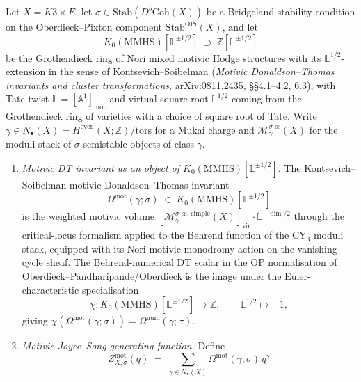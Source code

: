 \begin{conjecture}
\label{prop:k3e-cy3-motivic-dt-js-integrality-wc}
\ClaimStatusConjectured
Let $X = K3 \times E$, let $\sigma \in \mathrm{Stab}(D^b\mathrm{Coh}(X))$ be a Bridgeland stability condition on the Oberdieck--Pixton component $\mathrm{Stab}^{\mathrm{OPi}}(X)$, and let
\[
 K_0(\mathrm{MMHS})[\mathbb L^{\pm 1/2}] \;\supset\; \mathbb Z[\mathbb L^{\pm 1/2}]
\]
be the Grothendieck ring of Nori mixed motivic Hodge structures with its $\mathbb L^{1/2}$-extension in the sense of Kontsevich--Soibelman (\emph{Motivic Donaldson--Thomas invariants and cluster transformations}, arXiv:0811.2435, \S\S4.1--4.2, 6.3), with Tate twist $\mathbb L = [\mathbb A^1]_{\mathrm{mot}}$ and virtual square root $\mathbb L^{1/2}$ coming from the Grothendieck ring of varieties with a choice of square root of Tate. Write $\gamma \in N_\bullet(X) = H^{\mathrm{even}}(X; \mathbb Z)/\mathrm{tors}$ for a Mukai charge and $\mathcal M_\gamma^{\sigma\text{-ss}}(X)$ for the moduli stack of $\sigma$-semistable objects of class $\gamma$.
\begin{enumerate}[label=\textup{(\roman*)},leftmargin=1.5em]
 \item \emph{Motivic DT invariant as an object of $K_0(\mathrm{MMHS})[\mathbb L^{\pm 1/2}]$.} The Kontsevich--Soibelman motivic Donaldson--Thomas invariant
 \[
 \Omega^{\mathrm{mot}}(\gamma; \sigma) \;\in\; K_0(\mathrm{MMHS})[\mathbb L^{\pm 1/2}]
 \]
 is the weighted motivic volume $[\mathcal M_\gamma^{\sigma\text{-ss, simple}}(X)]_{\mathrm{vir}} \cdot \mathbb L^{-\dim/2}$ through the critical-locus formalism applied to the Behrend function of the CY$_3$ moduli stack, equipped with its Nori-motivic monodromy action on the vanishing cycle sheaf. The Behrend-numerical DT scalar in the OP normalisation of Oberdieck--Pandharipande/Oberdieck is the image under the Euler-characteristic specialisation
 \[
 \chi \colon K_0(\mathrm{MMHS})[\mathbb L^{\pm 1/2}] \longrightarrow \mathbb Z,
 \qquad \mathbb L^{1/2} \mapsto -1,
 \]
 giving $\chi(\Omega^{\mathrm{mot}}(\gamma; \sigma)) = \Omega^{\mathrm{num}}(\gamma; \sigma)$.
 \item \emph{Motivic Joyce--Song generating function.} Define
 \[
 Z^{\mathrm{mot}}_{X, \sigma}(q) \;=\; \sum_{\gamma \in N_\bullet(X)} \Omega^{\mathrm{mot}}(\gamma; \sigma) \, q^\gamma
\]
\end{enumerate}
\end{conjecture}
